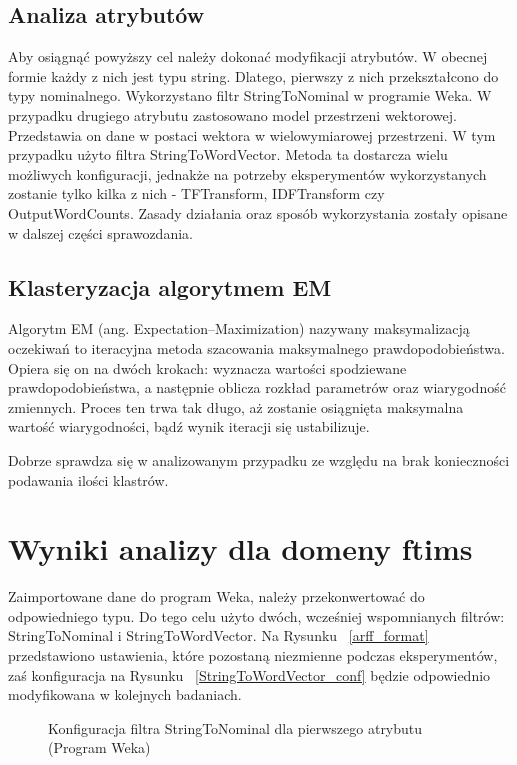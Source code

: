 \documentclass{classrep}
\begin{document}
    \subsection{Analiza atrybutów}
    Aby osiągnąć powyższy cel należy dokonać modyfikacji atrybutów. W obecnej formie każdy z nich jest typu string. Dlatego, pierwszy z nich przekształcono do typy nominalnego. Wykorzystano filtr StringToNominal w programie Weka. W przypadku drugiego atrybutu zastosowano model przestrzeni wektorowej. Przedstawia on dane w postaci wektora w wielowymiarowej przestrzeni. W tym przypadku użyto filtra StringToWordVector. Metoda ta dostarcza wielu możliwych konfiguracji, jednakże na potrzeby eksperymentów wykorzystanych zostanie tylko kilka z nich - TFTransform, IDFTransform czy OutputWordCounts. Zasady działania oraz sposób wykorzystania zostały opisane w dalszej części sprawozdania.
    
    \subsection{Klasteryzacja algorytmem EM}
    Algorytm EM (ang. Expectation–Maximization) nazywany maksymalizacją oczekiwań to iteracyjna metoda szacowania maksymalnego prawdopodobieństwa. Opiera się on na dwóch krokach: wyznacza wartości spodziewane prawdopodobieństwa, a następnie oblicza rozkład parametrów oraz wiarygodność zmiennych. Proces ten trwa tak długo, aż zostanie osiągnięta maksymalna wartość wiarygodności, bądź wynik iteracji się ustabilizuje.
    
    Dobrze sprawdza się w analizowanym przypadku ze względu na brak konieczności podawania ilości klastrów.
    
\newpage

\section{Wyniki analizy dla domeny ftims}
    
     Zaimportowane dane do program Weka, należy przekonwertować do odpowiedniego typu. Do tego celu użyto dwóch, wcześniej wspomnianych filtrów: StringToNominal i StringToWordVector. Na Rysunku ~\ref{arff_format} przedstawiono ustawienia, które pozostaną niezmienne podczas eksperymentów, zaś konfiguracja na Rysunku ~\ref{StringToWordVector_conf} będzie odpowiednio modyfikowana w kolejnych badaniach.
    
    \begin{figure}[H] 
    	\begin{center}
        \caption{Konfiguracja filtra StringToNominal dla pierwszego atrybutu (Program Weka)}
        \label{StringToNominal_conf}
    	\end{center}
    \end{figure}
\end{document}
